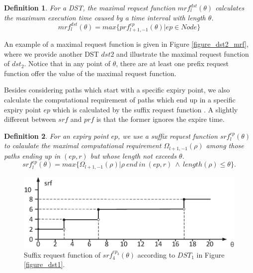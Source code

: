 \documentclass[conference]{IEEEtran}
\newtheorem{definition}{Definition}
\begin{document}
\begin{definition}
For a DST, the maximal request function $mrf^{dst}_l(\theta)$ calculates the maximum execution time caused by a time interval with length $\theta$.%
\begin{equation}
mrf^{dst}_l(\theta)=max\{prf^{ep}_{l+1,-1}(\theta)|ep\in Node\}
\end{equation}\label{equation_mrf}
\end{definition}

An example of a maximal request function is given in Figure \ref{figure_dst2_mrf}, where we provide another DST $dst2$ and illustrate the maximal request function of $dst_2$. Notice that in any point of $\theta$, there are at least one prefix request function offer the value of the maximal request function.

Besides considering paths which start with a specific expiry point, we also calculate the computational requirement of paths which end up in a specific expiry point $ep$ which is calculated by the suffix request function \cite{DBLP:journals/rts/Stigge015a}. A slightly different between $srf$ and $prf$ is that the former ignores the expire time.%

\begin{definition}
For an expiry point $ep$, we use a suffix request function $srf^{ep}_{l}(\theta)$ to calaulate the maximal computational requirement $\Omega_{l+1,-1}(\rho)$ among those paths ending up in $(ep,r)$ but whose length not exceeds $\theta$.
\begin{equation}
srf^{ep}_l(\theta)=max\{\Omega_{l+1,-1}(\rho)|\rho\ end\ in\ (ep,r)\ \wedge\ length(\rho)\leq \theta\}.
\end{equation}\label{equation_srf}
\end{definition}
\begin{figure}[t]
  \centering
  \includegraphics[scale=0.31]{graphics/figure_srf.eps}
  \caption{Suffix request function of $srf^{ep_3}_{4}(\theta)$ according to $DST_1$ in Figure \ref{figure_dst1}.} 
  \label{figure_srf}
\end{figure}
\end{document}
